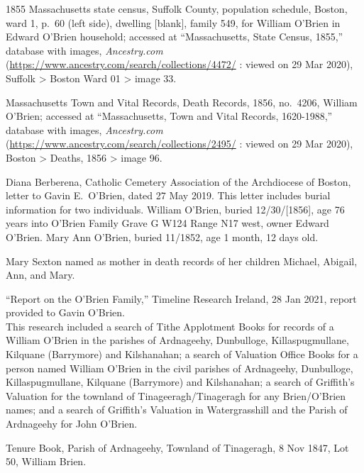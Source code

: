 \begin{thebibliography}{999}


1855 Massachusetts state census, Suffolk County, population schedule, Boston, ward 1, p.\ 60 (left side), dwelling [blank], family 549, for William O'Brien in Edward O'Brien household; accessed at ``Massachusetts, State Census, 1855,'' database with images, \textit{Ancestry.com} (\url{https://www.ancestry.com/search/collections/4472/} : viewed on 29 Mar 2020), Suffolk > Boston Ward 01 > image 33.

Massachusetts Town and Vital Records, Death Records, 1856, no.\ 4206, William O'Brien; accessed at ``Massachusetts, Town and Vital Records, 1620-1988,'' database with images, \textit{Ancestry.com} (\url{https://www.ancestry.com/search/collections/2495/} : viewed on 29 Mar 2020), Boston > Deaths, 1856 > image 96.

Diana Berberena, Catholic Cemetery Association of the Archdiocese of Boston, letter to Gavin E.\ O'Brien, dated 27 May 2019. This letter includes burial information for two individuals. William O'Brien, buried 12/30/[1856], age 76 years into O'Brien Family Grave G W124 Range N17 west, owner Edward O'Brien. Mary Ann O'Brien, buried 11/1852, age 1 month, 12 days old.

Mary Sexton named as mother in death records of her children Michael, Abigail, Ann, and Mary.

``Report on the O'Brien Family,'' Timeline Research Ireland, 28 Jan 2021, report provided to Gavin O'Brien.\\
This research included a search of Tithe Applotment Books for records of a William O'Brien in the parishes of Ardnageehy, Dunbulloge, Killaspugmullane, Kilquane (Barrymore) and Kilshanahan; a search of Valuation Office Books for a person named William O'Brien in the civil parishes of Ardnageehy, Dunbulloge, Killaspugmullane, Kilquane (Barrymore) and Kilshanahan; a search of Griffith's Valuation for the townland of Tinageeragh/Tinageragh for any Brien/O'Brien names; and a search of Griffith's Valuation in Watergrasshill and the Parish of Ardnageehy for John O'Brien.

Tenure Book, Parish of Ardnageehy, Townland of Tinageragh, 8 Nov 1847, Lot 50, William Brien.


\end{thebibliography}
